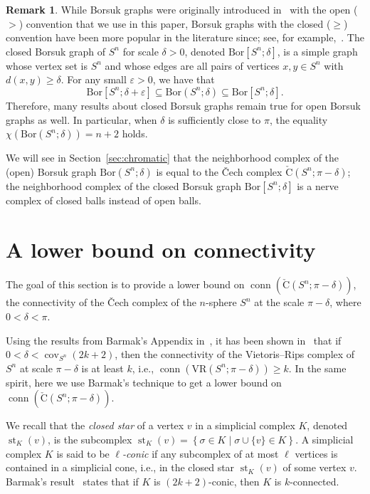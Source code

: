 \documentclass[11 pt,a4paper,twoside,reqno]{amsart}
\theoremstyle{definition}
\newtheorem{remark}[theorem]{Remark}
\newcommand{\vr}[2]{\mathrm{VR}(#1;#2)}
\newcommand{\cech}[2]{\mathrm{\check{C}}(#1;#2)}
\DeclareMathOperator{\conn}{conn}
\DeclareMathOperator{\st}{st}
\DeclareMathOperator{\cov}{cov}
\newcommand{\bor}[2]{\mathrm{Bor}(#1;#2)}
\newcommand{\cbor}[2]{\mathrm{Bor}[#1;#2]}
\begin{document}
\begin{remark}
\label{rem:opencloseborsuk}
While Borsuk graphs were originally introduced in~\cite{erdos-hajnal1967} with the open ($>$) convention that we use in this paper, Borsuk graphs with the closed ($\ge$) convention have been more popular in the literature since; see, for example,~\cite{Lovasz1978,lovasz1983self}.
The closed Borsuk graph of $S^n$ for scale $\delta>0$, denoted $\cbor{S^n}{\delta}$, is a simple graph whose vertex set is $S^n$ and whose edges are all pairs of vertices $x,y\in S^n$ with $d(x,y)\ge \delta$.
For any small $\varepsilon > 0$, we have that 
\begin{equation}
\label{eq:closeopencontainment}
\cbor{S^n}{\delta+\varepsilon} \subseteq\bor{S^n}{\delta} \subseteq \cbor{S^n}{\delta}.
\end{equation}
Therefore, many results about closed Borsuk graphs remain true for open Borsuk graphs as well.
In particular, when $\delta$ is sufficiently close to $\pi$, the equality $\chi(\bor{S^n}{\delta})=n+2$ holds.
\end{remark}

We will see in Section~\ref{sec:chromatic} that the neighborhood complex of the (open) Borsuk graph $\bor{S^n}{\delta}$ is equal to the \v{C}ech complex $\cech{S^n}{\pi-\delta}$; the neighborhood complex of the closed Borsuk graph $\cbor{S^n}{\delta}$ is a nerve complex of closed balls instead of open balls.



\section{A lower bound on connectivity}
\label{sec:lower}

The goal of this section is to provide a lower bound on $\conn(\cech{S^n}{\pi-\delta})$, the connectivity of the \v{C}ech complex of the $n$-sphere $S^n$ at the scale $\pi-\delta$, where $0<\delta<\pi$.

Using the results from Barmak's Appendix in~\cite{farber2023large}, it has been shown in~\cite[Section 4.1]{ABV} that if $0<\delta < \cov_{S^n}(2k+2)$, then the connectivity of the Vietoris--Rips complex of $S^n$ at scale $\pi-\delta$ is at least $k$, i.e., $\conn(\vr{S^n}{\pi-\delta}) \ge k$.
In the same spirit, here we use Barmak's technique to get a lower bound on $\conn(\cech{S^n}{\pi-\delta})$.

We recall that the \emph{closed star} of a vertex $v$ in a simplicial complex $K$, denoted $\st_K(v)$, is the subcomplex
$
\st_K(v) = \left\{ \sigma \in K \mid \sigma \cup \{v\} \in K \right\}
$.
A simplicial complex $K$ is said to be \emph{$\ell$-conic} if any subcomplex of at most $\ell$ vertices is contained in a simplicial cone, i.e., in the closed star $\st_K(v)$ of some vertex $v$.
Barmak's result~\cite[Appendix, Theorem~4]{farber2023large} states that if $K$ is $(2k+2)$-conic, then $K$ is $k$-connected.
\end{document}
